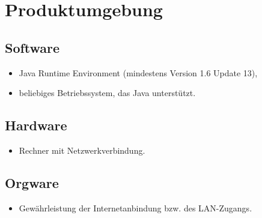 \section{Produktumgebung}
 \subsection{Software}
   \begin{itemize}
     \item Java Runtime Environment (mindestens Version 1.6 Update 13),
     \item beliebiges Betriebssystem, das Java unterstützt.
   \end{itemize}

 \subsection{Hardware}
   \begin{itemize}
     \item Rechner mit Netzwerkverbindung. 
   \end{itemize}


 \subsection{Orgware}
 \begin{itemize}
  \item Gewährleistung der Internetanbindung bzw. des LAN-Zugangs.
 \end{itemize}

